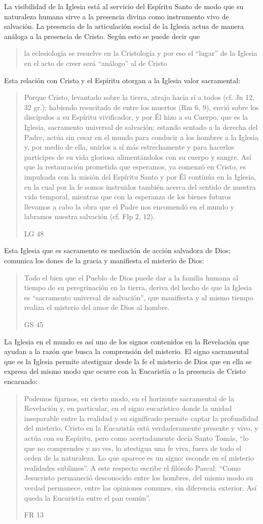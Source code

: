 La visibilidad de la Iglesia está al servicio del Espíritu Santo de modo que su
naturaleza humana sirve a la presencia divina como instrumento vivo de
salvación. La presencia de la articulación social de la Iglesia actua de manera
análoga a la presencia de Cristo. Según esto se puede decir que
\blockquote[{\cite[566]{ninot2009tf}}]{la eclesiología se resuelve en la
  Cristología y por eso el \enquote{lugar} de la Iglesia en el acto de creer
  será \enquote{análogo} al de Cristo}. Esta relación con Cristo y el Espíritu
otorgan a la Iglesia valor sacramental:
\blockquote[LG 48]{Porque Cristo, levantado sobre la tierra, atrajo hacia sí a
  todos (cf. Jn 12, 32 gr.); habiendo resucitado de entre los muertos (Rm 6, 9),
  envió sobre los discípulos a su Espíritu vivificador, y por Él hizo a su
  Cuerpo, que es la Iglesia, sacramento universal de salvación; estando sentado
  a la derecha del Padre, actúa sin cesar en el mundo para conducir a los
  hombres a la Iglesia y, por medio de ella, unirlos a sí más estrechamente y
  para hacerlos partícipes de su vida gloriosa alimentándolos con su cuerpo y
  sangre. Así que la restauración prometida que esperamos, ya comenzó en Cristo,
  es impulsada con la misión del Espíritu Santo y por Él continúa en la Iglesia,
  en la cual por la fe somos instruidos también acerca del sentido de nuestra
  vida temporal, mientras que con la esperanza de los bienes futuros llevamos a
  cabo la obra que el Padre nos encomendó en el mundo y labramos nuestra
  salvación (cf. Flp 2, 12).}
Esta Iglesia que es sacramento es mediación de acción salvadora de Dios;
comunica los dones de la gracia y manifiesta el misterio de Dios:
\blockquote[GS 45]{Todo el bien que el Pueblo de Dios puede dar a la familia
  humana al tiempo de su peregrinación en la tierra, deriva del hecho de que la
  Iglesia es ``sacramento universal de salvación'', que manifiesta y al mismo
  tiempo realiza el misterio del amor de Dios al hombre.}

La Iglesia en el mundo es así uno de los signos contenidos en la Revelación que
ayudan a la razón que busca la comprensión del misterio. El signo sacramental
que es la Iglesia permite atestiguar desde la fe el misterio de Dios que en ella
se expresa del mismo modo que ocurre con la Eucaristía o la presencia de Cristo
encarnado:
\blockquote[FR 13]{Podemos fijarnos, en cierto modo, en el horizonte sacramental
  de la Revelación y, en particular, en el signo eucarístico donde la unidad
  inseparable entre la realidad y su significado permite captar la profundidad
  del misterio. Cristo en la Eucaristía está verdaderamente presente y vivo, y
  actúa con su Espíritu, pero como acertadamente decía Santo Tomás, \enquote{lo
    que no comprendes y no ves, lo atestigua una fe viva, fuera de todo el orden
    de la naturaleza. Lo que aparece es un signo: esconde en el misterio
    realidades sublimes}. A este respecto escribe el filósofo Pascal:
  \enquote{Como Jesucristo permaneció desconocido entre los hombres, del mismo
    modo su verdad permanece, entre las opiniones comunes, sin diferencia
    exterior. Así queda la Eucaristía entre el pan común}.}

